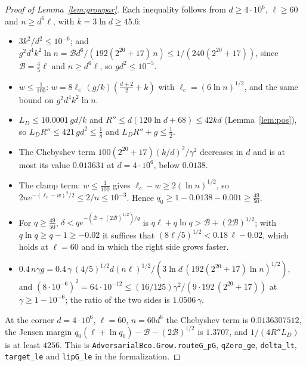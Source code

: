 \documentclass[11pt]{amsart}
\theoremstyle{definition}
\numberwithin{equation}{section}
\begin{document}
\begin{proof}[Proof of Lemma~\ref{lem:growpar}]
Each inequality follows from $d\ge4\cdot10^6$, $\ell\ge60$ and $n\ge d^6\ell$, with $k=3\ln d\ge45.6$:
\begin{itemize}[leftmargin=*]
\item $3k^2/d^2\le10^{-6}$; and $g^2d^4k^2\ln n=\mathcal Bd^6/(192(2^{20}+17)\,n)\le1/(240(2^{20}+17))$, since $\mathcal B=\frac45\ell$ and $n\ge d^6\ell$, so $gd^2\le10^{-5}$.
\item $w\le\frac1{100}$: $w=8\ell_c\,(g/k)(\frac{d+2}2+k)$ with $\ell_c=(6\ln n)^{1/2}$, and the same bound on $g^2d^4k^2\ln n$.
\item $L_D\le10.0001\,gd/k$ and $R''\le d(120\ln d+68)\le42kd$ (Lemma~\ref{lem:pos}), so $L_DR''\le421\,gd^2\le\frac18$ and $L_DR''+g\le\frac12$.
\item The Chebyshev term $100(2^{20}+17)(k/d)^2/\gamma^2$ decreases in $d$ and is at most its value $0.013631$ at $d=4\cdot10^6$, below $0.0138$.
\item The clamp term: $w\le\frac1{100}$ gives $\ell_c-w\ge2(\ln n)^{1/2}$, so $2ne^{-(\ell_c-w)^2/2}\le2/n\le10^{-3}$. Hence $q_0\ge1-0.0138-0.001\ge\frac{49}{50}$.
\item For $q\ge\frac{49}{50}$, $\delta<qe^{-(\mathcal B+(2\mathcal B)^{1/2})/q}$ is $q\ell+q\ln q>\mathcal B+(2\mathcal B)^{1/2}$; with $q\ln q\ge q-1\ge-0.02$ it suffices that $(8\ell/5)^{1/2}<0.18\,\ell-0.02$, which holds at $\ell=60$ and in which the right side grows faster.
\item $0.4\,n\gamma g=0.4\,\gamma\,(4/5)^{1/2}d(n\ell)^{1/2}/(3\ln d\,(192(2^{20}+17)\ln n)^{1/2})$, and $(8\cdot10^{-6})^2=64\cdot10^{-12}\le(16/125)\gamma^2/(9\cdot192\,(2^{20}+17))$ at $\gamma\ge1-10^{-6}$; the ratio of the two sides is $1.0506\,\gamma$.
\end{itemize}
At the corner $d=4\cdot10^6$, $\ell=60$, $n=60d^6$ the Chebyshev term is $0.0136307512$, the Jensen margin $q_0(\ell+\ln q_0)-\mathcal B-(2\mathcal B)^{1/2}$ is $1.3707$, and $1/(4R''L_D)$ is at least $4256$.
This is \texttt{AdversarialBco.Grow.routeG\_pG}, \texttt{qZero\_ge}, \texttt{delta\_lt}, \texttt{target\_le} and \texttt{lipG\_le} in the formalization.
\end{proof}
\end{document}
